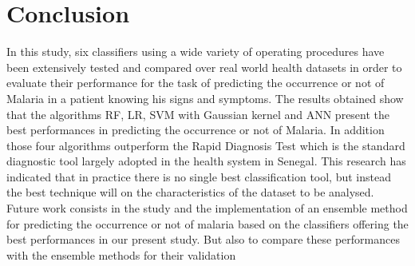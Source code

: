 \section{Conclusion}
In this study, six classifiers using a wide variety of operating procedures have been extensively tested and compared over real world health datasets in order to evaluate their performance for the task of predicting the occurrence or not of Malaria in a patient knowing his signs and symptoms. The results obtained show that the algorithms RF, LR,
SVM with Gaussian kernel and ANN present the best performances in predicting the occurrence or not of Malaria. In addition those four algorithms outperform the Rapid Diagnosis Test which is the standard diagnostic tool largely adopted in the health system in
Senegal. This research has indicated that in practice there is no single best classification tool, but instead the best technique will on the characteristics of the dataset to be analysed. 
Future work consists in the study and the implementation of an ensemble method for predicting the occurrence or not of malaria based on the classifiers offering the best performances in our present study. But also to compare these performances with the ensemble methods for their validation

